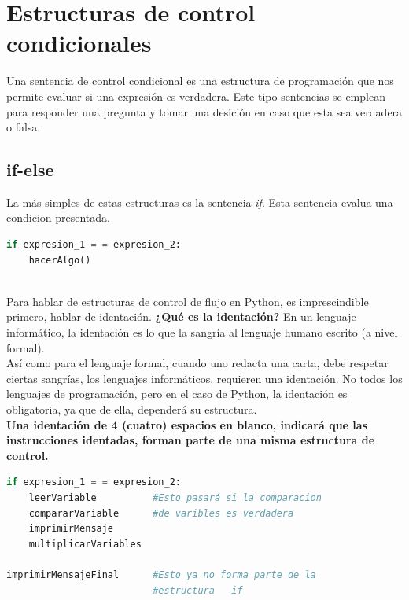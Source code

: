 \documentclass[a4paper, openright, 12pt]{article}
\begin{document}
    \newpage{}




  \section{Estructuras de control condicionales}
    Una sentencia de control condicional es una estructura de programación que nos permite evaluar si una expresión es verdadera. Este tipo sentencias se emplean para responder una pregunta y tomar una desición en caso que esta sea verdadera o falsa.

    \subsection{if-else}
      La más simples de estas estructuras es la sentencia \textit{if}. Esta sentencia evalua una condicion presentada.\\

\begin{lstlisting}[language=Python]
if expresion_1 = = expresion_2:
    hacerAlgo()
\end{lstlisting}

    \\Para hablar de estructuras de control de flujo en Python, es imprescindible primero, hablar de identación. \textbf{¿Qué es la identación?} En un lenguaje informático, la identación es lo que la sangría al lenguaje humano escrito (a nivel formal).\\

    Así como para el lenguaje formal, cuando uno redacta una carta, debe respetar ciertas sangrías, los lenguajes informáticos, requieren una identación. No todos los lenguajes de programación, pero en el caso de Python, la identación es obligatoria, ya que de ella, dependerá su estructura.\\

    \textbf{Una identación de 4 (cuatro) espacios en blanco, indicará que las instrucciones identadas, forman parte de una misma estructura de control.}\\

\begin{lstlisting}[language=Python]
if expresion_1 = = expresion_2:
    leerVariable          #Esto pasará si la comparacion
    compararVariable      #de varibles es verdadera
    imprimirMensaje
    multiplicarVariables

imprimirMensajeFinal      #Esto ya no forma parte de la
                          #estructura   if
\end{lstlisting}
\end{document}
